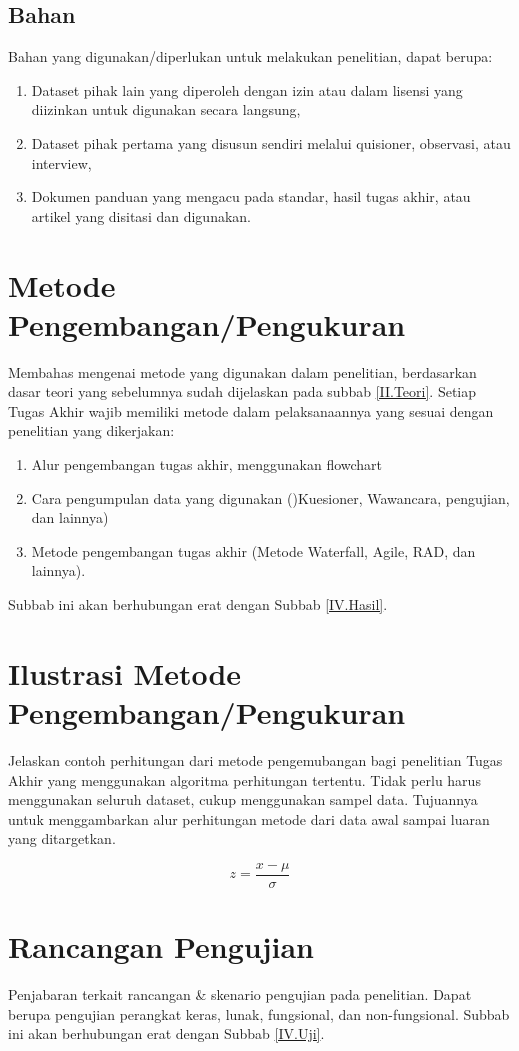 \subsection{Bahan} \label{III.Bahan}
Bahan yang digunakan/diperlukan untuk melakukan penelitian, dapat berupa: \par
\begin{enumerate}[noitemsep]
	\item Dataset pihak lain yang diperoleh dengan izin atau dalam lisensi yang diizinkan untuk digunakan secara langsung,
	\item Dataset pihak pertama yang disusun sendiri melalui quisioner, observasi, atau interview,
	\item Dokumen panduan yang mengacu pada standar, hasil tugas akhir, atau artikel yang disitasi dan digunakan. 
\end{enumerate}

\section{Metode Pengembangan/Pengukuran} \label{III.Metode}
Membahas mengenai metode yang digunakan dalam penelitian, berdasarkan dasar teori yang sebelumnya sudah dijelaskan pada subbab \ref{II.Teori}. Setiap Tugas Akhir wajib memiliki metode dalam pelaksanaannya yang sesuai dengan penelitian yang dikerjakan: \par
\begin{enumerate}[noitemsep]
	\item Alur pengembangan tugas akhir, menggunakan flowchart
	\item Cara pengumpulan data yang digunakan ()Kuesioner, Wawancara, pengujian, dan lainnya)
	\item Metode pengembangan tugas akhir (Metode Waterfall, Agile, RAD, dan lainnya).
\end{enumerate}
Subbab ini akan berhubungan erat dengan Subbab \ref{IV.Hasil}. \par

\section{Ilustrasi Metode Pengembangan/Pengukuran} \label{III.Ilustrasi}
Jelaskan contoh perhitungan dari metode pengemubangan bagi penelitian Tugas Akhir yang menggunakan algoritma perhitungan tertentu. Tidak perlu harus menggunakan seluruh dataset, cukup menggunakan sampel data. Tujuannya untuk menggambarkan alur perhitungan metode dari data awal sampai luaran yang ditargetkan. \par
\begin{equation}
	z = \frac{x - \mu}{\sigma}
\end{equation}
\label{eq:3.transnormal}

\section{Rancangan Pengujian} \label{III.Rancang Uji}
Penjabaran terkait rancangan \& skenario pengujian pada penelitian. Dapat berupa pengujian perangkat keras, lunak, fungsional, dan non-fungsional. Subbab ini akan berhubungan erat dengan Subbab \ref{IV.Uji}. \par